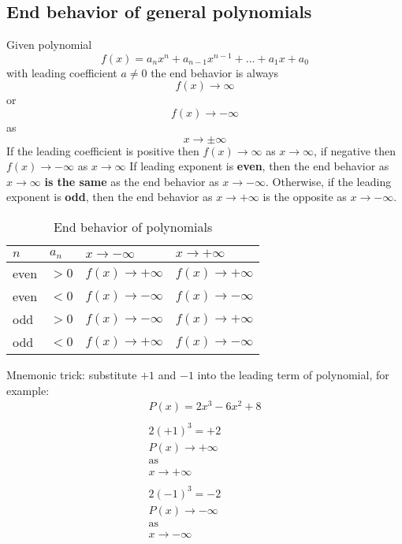 \documentclass{article}
\begin{document}
\subsection{End behavior of general polynomials}
Given polynomial
\begin{equation}
  f(x) = a_nx^n + a_{n-1}x^{n-1} + ... +a_1x + a_0
\end{equation}
with leading coefficient $a \neq 0$ the end behavior is always
\begin{equation}
  f(x) \rightarrow \infty
\end{equation}
or
\begin{equation}
  f(x) \rightarrow -\infty
\end{equation}
as
\begin{equation}
  x \rightarrow \pm \infty
\end{equation}
If the leading coefficient is positive then
$f(x) \rightarrow \infty$ as $x \rightarrow \infty$,
if negative then
$f(x) \rightarrow -\infty$ as $x \rightarrow \infty$
If leading exponent is \textbf{even}, then the end behavior as $x \rightarrow \infty$ \textbf{is the same} as the end behavior as $x \rightarrow -\infty$.
Otherwise, if the leading exponent is \textbf{odd}, then the end behavior as $x \rightarrow +\infty$ is the opposite as $x \rightarrow -\infty$.
\begin{table}[htbp]
  \centering
  \begin{tabular}{|l|l|l|l|}
    \hline
    \textbf{$n$} & \textbf{$a_n$} & \textbf{$x \rightarrow -\infty$} & \textbf{$x \rightarrow +\infty$} \\
    \hline
    even & $>0$ & $f(x) \rightarrow +\infty$ & $f(x) \rightarrow +\infty$ \\
    \hline
    even & $<0$ & $f(x) \rightarrow -\infty$ & $f(x) \rightarrow -\infty$ \\
    \hline
    odd & $>0$ & $f(x) \rightarrow -\infty$ & $f(x) \rightarrow +\infty$ \\
    \hline
    odd & $<0$ & $f(x) \rightarrow +\infty$ & $f(x) \rightarrow -\infty$ \\
    \hline
  \end{tabular}
  \caption{End behavior of polynomials}
  \label{tab:end_behavior_of_polynomials}
\end{table}
Mnemonic trick:
substitute $+1$ and $-1$ into the leading term of polynomial, for example:
\begin{equation}
  \begin{gathered}
    P(x) = 2x^3 - 6x^2 + 8 \\
    \\
    2(+1)^3 = +2 \\
    P(x) \rightarrow +\infty \\
    \text{as} \\
    x \rightarrow +\infty \\
    \\
    2(-1)^3 = -2 \\
    P(x) \rightarrow -\infty \\
    \text{as} \\
    x \rightarrow -\infty \\
  \end{gathered}
\end{equation}
\end{document}
